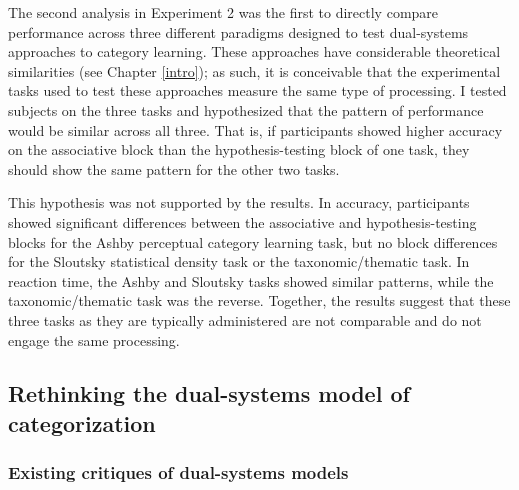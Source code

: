 \documentclass[../dissertation.tex]{subfiles}
\begin{document}
The second analysis in Experiment 2 was the first to directly compare performance across three different paradigms designed to test dual-systems approaches to category learning. These approaches have considerable theoretical similarities (see Chapter \ref{intro}); as such, it is conceivable that the experimental tasks used to test these approaches measure the same type of processing. I tested subjects on the three tasks and hypothesized that the pattern of performance would be similar across all three. That is, if participants showed higher accuracy on the associative block than the hypothesis-testing block of one task, they should show the same pattern for the other two tasks. \par
This hypothesis was not supported by the results. In accuracy, participants showed significant differences between the associative and hypothesis-testing blocks for the Ashby perceptual category learning task, but no block differences for the Sloutsky statistical density task or the taxonomic/thematic task. In reaction time, the Ashby and Sloutsky tasks showed similar patterns, while the taxonomic/thematic task was the reverse. Together, the results suggest that these three tasks as they are typically administered are not comparable and do not engage the same processing.



\subsection{Rethinking the dual-systems model of categorization}

\subsubsection{Existing critiques of dual-systems models}
\end{document}
